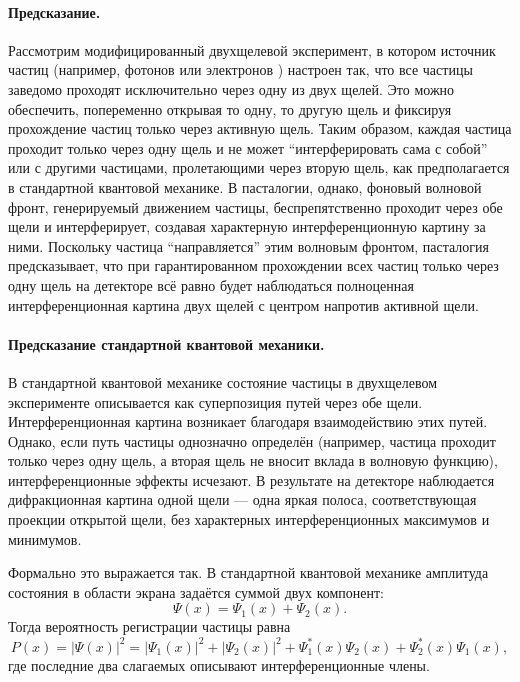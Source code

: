 \documentclass[pdflatex,sn-mathphys-num,referee]{sn-jnl}
\begin{document}
\paragraph{Предсказание.} Рассмотрим модифицированный двухщелевой эксперимент, в котором источник частиц (например, фотонов или электронов \cite{tonomura1989-electron}) настроен так, что все частицы заведомо проходят исключительно через одну из двух щелей. Это можно обеспечить, попеременно открывая то одну, то другую щель и фиксируя прохождение частиц только через активную щель. Таким образом, каждая частица проходит только через одну щель и не может ``интерферировать сама с собой'' или с другими частицами, пролетающими через вторую щель, как предполагается в стандартной квантовой механике. В пасталогии, однако, фоновый волновой фронт, генерируемый движением частицы, беспрепятственно проходит через обе щели и интерферирует, создавая характерную интерференционную картину за ними. Поскольку частица ``направляется'' этим волновым фронтом, пасталогия предсказывает, что при гарантированном прохождении всех частиц только через одну щель на детекторе всё равно будет наблюдаться полноценная интерференционная картина двух щелей с центром напротив активной щели.

\paragraph{Предсказание стандартной квантовой механики.} В стандартной квантовой механике состояние частицы в двухщелевом эксперименте описывается как суперпозиция путей через обе щели. Интерференционная картина возникает благодаря взаимодействию этих путей. Однако, если путь частицы однозначно определён (например, частица проходит только через одну щель, а вторая щель не вносит вклада в волновую функцию), интерференционные эффекты исчезают. В результате на детекторе наблюдается дифракционная картина одной щели --- одна яркая полоса, соответствующая проекции открытой щели, без характерных интерференционных максимумов и минимумов.

Формально это выражается так. В стандартной квантовой механике амплитуда состояния в области экрана задаётся суммой двух компонент:
\begin{equation}
    \Psi(x) = \Psi_1(x) + \Psi_2(x).
\end{equation}
Тогда вероятность регистрации частицы равна
\begin{equation}
    P(x) = |\Psi(x)|^2 = |\Psi_1(x)|^2 + |\Psi_2(x)|^2 + \Psi_1^*(x)\Psi_2(x) + \Psi_2^*(x)\Psi_1(x),
\end{equation}
где последние два слагаемых описывают интерференционные члены.
\end{document}
